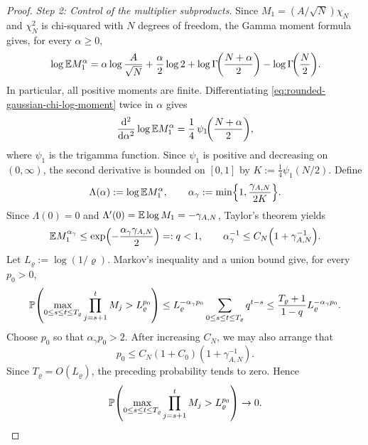 \documentclass[11pt,reqno,a4paper]{article}
\newcommand{\Pp}{\P}
\newcommand{\Ee}{\E}
\begin{document}
\begin{proof}
  \emph{Step 2: Control of the multiplier subproducts.}
  Since $M_1=(A/\sqrt N)\chi_N$ and $\chi_N^2$ is
  chi-squared with $N$ degrees of freedom, the Gamma moment formula gives, for
  every $\alpha\geq0$,
  \begin{equation}\label{eq:rounded-gaussian-chi-log-moment}
    \log\Ee M_1^\alpha
    =
    \alpha\log\frac A{\sqrt N}
    +\frac\alpha2\log2
    +\log\Gamma\!\left(\frac{N+\alpha}2\right)
    -\log\Gamma\!\left(\frac N2\right).
  \end{equation}
  In particular, all positive moments are finite. Differentiating
  \cref{eq:rounded-gaussian-chi-log-moment} twice in $\alpha$ gives
  \begin{equation*}
    \frac{\mathrm{d}^2}{\mathrm{d}\alpha^2}\log\Ee M_1^\alpha
    =
    \frac14\,\psi_1\!\left(\frac{N+\alpha}2\right),
  \end{equation*}
  where $\psi_1$ is the trigamma function. Since $\psi_1$ is positive and
  decreasing on $(0,\infty)$, the second derivative is bounded on $[0,1]$ by
  $K:=\tfrac14\psi_1(N/2)$. Define
  \begin{equation*}
    \Lambda(\alpha):=\log\Ee M_1^\alpha,
    \qquad
    \alpha_\gamma
    :=
    \min\left\{1,\frac{\gamma_{A,N}}{2K}\right\}.
  \end{equation*}
  Since $\Lambda(0)=0$ and
  $\Lambda'(0)=\Ee\log M_1=-\gamma_{A,N}$, Taylor's theorem yields
  \begin{equation*}
    \Ee M_1^{\alpha_\gamma}
    \leq
    \exp\left(-\frac{\alpha_\gamma\gamma_{A,N}}2\right)
    =:q<1,
    \qquad
    \alpha_\gamma^{-1}
    \leq
    C_N\left(1+\gamma_{A,N}^{-1}\right).
  \end{equation*}
  Let $L_\varrho:=\log(1/\varrho)$. Markov's inequality and a union bound
  give, for every $p_0>0$,
  \begin{equation*}
    \Pp\left(
      \max_{0\leq s\leq t\leq T_\varrho}
      \prod_{j=s+1}^tM_j
      >
      L_\varrho^{p_0}
    \right)
    \leq
    L_\varrho^{-\alpha_\gamma p_0}
    \sum_{0\leq s\leq t\leq T_\varrho}q^{t-s}
    \leq
    \frac{T_\varrho+1}{1-q}
    L_\varrho^{-\alpha_\gamma p_0}.
  \end{equation*}
  Choose $p_0$ so that $\alpha_\gamma p_0>2$. After increasing $C_N$, we may
  also arrange that
  \begin{equation*}
    p_0
    \leq
    C_N(1+C_0)\left(1+\gamma_{A,N}^{-1}\right).
  \end{equation*}
  Since $T_\varrho=O(L_\varrho)$, the preceding probability tends to zero.
  Hence
  \begin{equation}\label{eq:rounded-gaussian-subproduct-bound}
    \Pp\left(
      \max_{0\leq s\leq t\leq T_\varrho}
      \prod_{j=s+1}^tM_j
      >
      L_\varrho^{p_0}
    \right)
    \to0 .
  \end{equation}


\end{proof}
\end{document}
